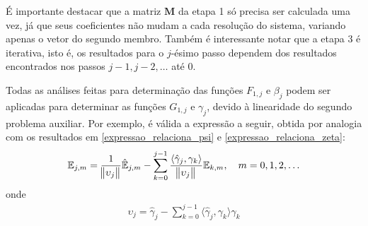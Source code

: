 É importante destacar que a matriz $\mathbf{M}$ da etapa 1 só precisa ser calculada uma vez, já que seus coeficientes não mudam a cada resolução do sistema, variando apenas o vetor do segundo membro. Também é interessante notar que a etapa 3 é iterativa, isto é, os resultados para o $j$-ésimo passo dependem dos resultados encontrados nos passos $j - 1, j - 2, \ldots$ até 0.

Todas as análises feitas para determinação das funções $F_{1,j}$ e $\beta_j$ podem ser aplicadas para determinar as funções $G_{1,j}$ e $\gamma_j$, devido à linearidade do segundo problema auxiliar. Por exemplo, é válida a expressão a seguir, obtida por analogia com os resultados em \eqref{expressao_relaciona_psi} e \eqref{expressao_relaciona_zeta}:
\begin{align}
\mathbb{E}_{j,m} = \frac{1}{\norm{\upsilon_j}} \hat{\mathbb{E}}_{j,m} - \sum_{k=0}^{j-1} \frac{\langle \hat{\gamma}_j, \gamma_k \rangle}{\norm{\upsilon_j}} \mathbb{E}_{k,m}, \quad m=0,1,2,\ldots \label{expressao_relaciona_omega}
\end{align}
onde
\begin{align}
	\upsilon_j = \hat{\gamma}_j - \displaystyle\sum_{k = 0}^{j - 1} \langle \hat{\gamma}_j, \gamma_k\rangle\gamma_k
\end{align}

